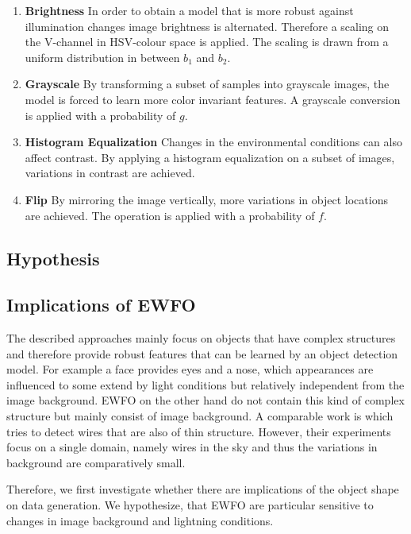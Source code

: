 \begin{enumerate}
	\item \textbf{Brightness} In order to obtain a model that is more robust against illumination changes image brightness is alternated. Therefore a scaling on the V-channel in HSV-colour space is applied. The scaling is drawn from a uniform distribution in between $b_1$ and $b_2$.
	
	\item \textbf{Grayscale} By transforming a subset of samples into grayscale images, the model is forced to learn more color invariant features. A grayscale conversion is applied with a probability of $g$.
	
	\item \textbf{Histogram Equalization} Changes in the environmental conditions can also affect contrast. By applying a histogram equalization on a subset of images, variations in contrast are achieved. 
	
	\item \textbf{Flip} By mirroring the image vertically, more variations in object locations are achieved. The operation is applied with a probability of $f$.
\end{enumerate}


\subsection{Hypothesis}
\label{sec:training:hypothesis}

\subsection{Implications of \ac{EWFO}}

The described approaches mainly focus on objects that have complex structures and therefore provide robust features that can be learned by an object detection model. For example a face provides eyes and a nose, which appearances are influenced to some extend by light conditions but relatively independent from the image background. \ac{EWFO} on the other hand do not contain this kind of complex structure but mainly consist of image background. A comparable work is \cite{Madaan2017} which tries to detect wires that are also of thin structure. However, their experiments focus on a single domain, namely wires in the sky and thus the variations in background are comparatively small.

Therefore, we first investigate whether there are implications of the object shape on data generation. We hypothesize, that \ac{EWFO} are particular sensitive to changes in image background and lightning conditions. 


